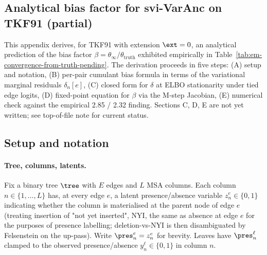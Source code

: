 \subsection{Analytical bias factor for svi-VarAnc on TKF91 (partial)}
\label{app:varanc-bias-derivation}

This appendix derives, for TKF91 with extension $\ext = 0$, an
analytical prediction of the bias factor $\beta = \theta_\infty /
\theta_{\text{truth}}$ exhibited empirically in
Table~\ref{tab:em-convergence-from-truth-pending}.  The derivation
proceeds in five steps: (A) setup and notation, (B) per-pair
cumulant bias formula in terms of the variational marginal
residuals $\delta_n[e]$, (C) closed form for $\delta$ at ELBO
stationarity under tied edge logits, (D) fixed-point equation for
$\beta$ via the M-step Jacobian, (E) numerical check against the
empirical 2.85 / 2.32 finding.  Sections C, D, E are not yet
written; see top-of-file note for current status.

\subsection{Setup and notation}
\label{app:varanc-bias-setup}

\paragraph{Tree, columns, latents.}
Fix a binary tree $\tree$ with $E$ edges and $L$ MSA columns.
Each column $n \in \{1, \dots, L\}$ has, at every edge $e$,
a latent presence/absence variable $z_n^e \in \{0, 1\}$
indicating whether the column is materialised at the parent node
of edge $e$ (treating insertion of "not yet inserted", NYI, the
same as absence at edge $e$ for the purposes of presence
labelling; deletion-vs-NYI is then disambiguated by Felsenstein
on the up-pass).  Write $\pres_n^e = z_n^e$ for brevity.  Leaves
have $\pres_n^\ell$ clamped to the observed presence/absence
$y_n^\ell \in \{0, 1\}$ in column $n$.

